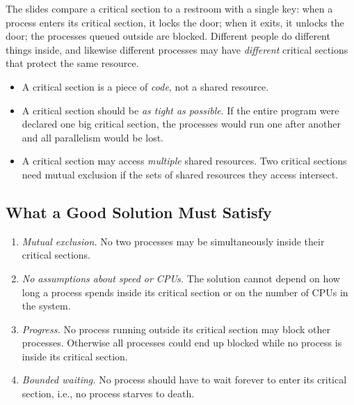 The slides compare a critical section to a restroom with a single key: when a process enters its critical section, it locks the door; when it exits, it unlocks the door; the processes queued outside are blocked. Different people do different things inside, and likewise different processes may have \emph{different} critical sections that protect the same resource.

\begin{keypoint}
  \begin{itemize}
    \item A critical section is a piece of \emph{code}, not a shared resource.
    \item A critical section should be \emph{as tight as possible}. If the entire program were declared one big critical section, the processes would run one after another and all parallelism would be lost.
    \item A critical section may access \emph{multiple} shared resources. Two critical sections need mutual exclusion if the sets of shared resources they access intersect.
  \end{itemize}
\end{keypoint}

\subsection{What a Good Solution Must Satisfy}

\begin{keypoint}
  \label{kp:csreq}
  \begin{enumerate}
    \item \emph{Mutual exclusion.} No two processes may be simultaneously inside their critical sections.
    \item \emph{No assumptions about speed or CPUs.} The solution cannot depend on how long a process spends inside its critical section or on the number of CPUs in the system.
    \item \emph{Progress.} No process running outside its critical section may block other processes. Otherwise all processes could end up blocked while no process is inside its critical section.
    \item \emph{Bounded waiting.} No process should have to wait forever to enter its critical section, i.e., no process starves to death.
  \end{enumerate}
\end{keypoint}

